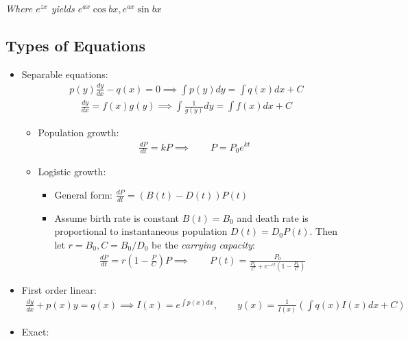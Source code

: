 \emph{Where \(e^{zx}\) yields \(e^{ax}\cos bx, e^{ax}\sin bx\)}

\hypertarget{types-of-equations}{%
\subsection{Types of Equations}\label{types-of-equations}}

\begin{itemize}
\tightlist
\item
  Separable equations:
  \begin{align*}p(y)\frac{dy}{dx} - q(x) = 0 \implies \int p(y) dy = \int q(x) dx + C\end{align*}
  \begin{align*}
  \frac{dy}{dx} = f(x)g(y) \implies \int \frac{1}{g(y)}dy = \int f(x) dx + C
  \end{align*}

  \begin{itemize}
  \tightlist
  \item
    Population growth:
    \begin{align*}\frac{dP}{dt} = kP \implies \qquad P = P_0 e^{kt}\end{align*}
  \item
    Logistic growth:

    \begin{itemize}
    \tightlist
    \item
      General form: \(\frac{dP}{dt} =(B(t) - D(t))P(t)\)
    \item
      Assume birth rate is constant \(B(t) = B_0\) and death rate is
      proportional to instantaneous population \(D(t) = D_0 P(t)\). Then
      let \(r = B_0, C = B_0/D_0\) be the \emph{carrying capacity}:
      \begin{align*}\frac{dP}{dt} = r\left( 1 - \frac{P}{C} \right)P \implies \qquad P(t) = \frac{P_0}{\frac{P_0}{C} + e^{-rt}(1 - \frac{P_0}{C})}\end{align*}
    \end{itemize}
  \end{itemize}
\item
  First order linear:
  \begin{align*}\frac{dy}{dx} + p(x)y = q(x) \implies I(x) = e^{\int p(x) dx},\qquad y(x) = \frac{1}{I(x)}\left(\int q(x)I(x) dx + C\right)\end{align*}
\item
  Exact:


\end{itemize}
